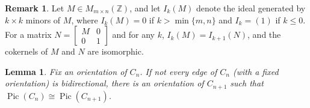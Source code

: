 \documentclass[11pt,reqno]{amsart}
\DeclareMathOperator{\Pic}{Pic}
\theoremstyle{definition}
\newtheorem{myeg}[mydef]{Example}
\newtheorem{rmk}[mydef]{Remark}
\theoremstyle{plain}
\newtheorem{lem}[mydef]{Lemma}
\begin{document}



		
		\begin{rmk}\label{remark: embedding}
			Let $M \in M_{m \times n}(\mathbb{Z})$, 
			and let $I_k(M)$ denote the ideal generated by $k \times k$ minors of $M$, 
			where $I_k(M) = 0$ if $k > \min\{m,n\}$ and $I_k = (1)$ if $k \le 0$. 
			For a matrix $N = \left[ \begin{array}{c|c}
				M & 0 \\
				\hline
				0 & 1
			\end{array} \right]$ and for any $k$, $I_k(M) = I_{k+1}(N)$, and the cokernels of $M$ and $N$ are isomorphic. 
		\end{rmk}
\begin{lem} \label{obj0}
Fix an orientation of $C_n$. If not every edge of $C_n$ (with a fixed orientation) is bidirectional, there is an orientation of $C_{n+1}$ such that $\Pic (C_n) \cong \Pic (C_{n+1})$. 
\end{lem}
\end{document}
